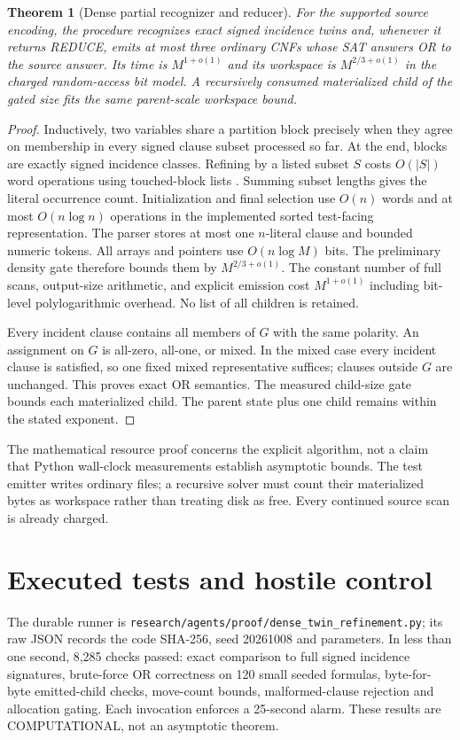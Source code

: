 \documentclass[11pt]{article}
\newtheorem{theorem}{Theorem}
\begin{document}
\begin{theorem}[Dense partial recognizer and reducer]
For the supported source encoding, the procedure recognizes exact signed
incidence twins and, whenever it returns REDUCE, emits at most three
ordinary CNFs whose SAT answers OR to the source answer. Its time is
$M^{1+o(1)}$ and its workspace is $M^{2/3+o(1)}$ in the charged
random-access bit model. A recursively consumed materialized child of
the gated size fits the same parent-scale workspace bound.
\end{theorem}
\begin{proof}
Inductively, two variables share a partition block precisely when they
agree on membership in every signed clause subset processed so far.
At the end, blocks are exactly signed incidence classes.
Refining by a listed subset $S$ costs $O(|S|)$ word operations using
touched-block lists \cite{partition}. Summing subset lengths gives the
literal occurrence count. Initialization and final selection use
$O(n)$ words and at most $O(n\log n)$ operations in the implemented
sorted test-facing representation. The parser stores at most one
$n$-literal clause and bounded numeric tokens. All arrays and pointers
use $O(n\log M)$ bits. The preliminary density gate therefore bounds
them by $M^{2/3+o(1)}$. The constant number of full scans, output-size
arithmetic, and explicit emission cost $M^{1+o(1)}$ including bit-level
polylogarithmic overhead. No list of all children is retained.

Every incident clause contains all members of $G$ with the same polarity.
An assignment on $G$ is all-zero, all-one, or mixed. In the mixed case
every incident clause is satisfied, so one fixed mixed representative
suffices; clauses outside $G$ are unchanged. This proves exact OR
semantics. The measured child-size gate bounds each materialized child.
The parent state plus one child remains within the stated exponent.
\end{proof}

The mathematical resource proof concerns the explicit algorithm, not a
claim that Python wall-clock measurements establish asymptotic bounds.
The test emitter writes ordinary files; a recursive solver must count
their materialized bytes as workspace rather than treating disk as free.
Every continued source scan is already charged.

\section{Executed tests and hostile control}
The durable runner is
\texttt{research/agents/proof/dense\_twin\_refinement.py}; its raw JSON
records the code SHA-256, seed 20261008 and parameters. In less than one
second, 8,285 checks passed: exact comparison to full signed incidence
signatures, brute-force OR correctness on 120 small seeded formulas,
byte-for-byte emitted-child checks, move-count bounds, malformed-clause
rejection and allocation gating. Each invocation enforces a 25-second
alarm. These results are COMPUTATIONAL, not an asymptotic theorem.
\end{document}
